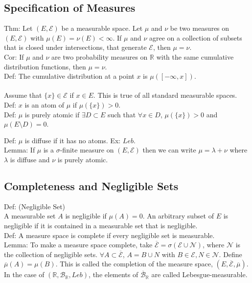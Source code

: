 \documentclass[english, 11pt]{article}
\begin{document}
\subsection{Specification of Measures}

Thm: Let $(E, \mathcal{E})$ be a measurable space. Let $\mu$ and $\nu$ be two measures on $(E, \mathcal{E})$ with $\mu(E) = \nu(E) < \infty$. If $\mu$ and $\nu$ agree on a collection of subsets that is closed under intersections, that generate $\mathcal{E}$, then $\mu = \nu$.\\

Cor: If $\mu$ and $\nu$ are two probability measures on $\mathbb{R}$ with the same cumulative distribution functions, then $\mu = \nu$.\\

Def: The cumulative distribution at a point $x$ is $\mu([-\infty, x])$.\\\\

Assume that $\{x\} \in \mathcal{E}$ if $x \in E$. This is true of all standard measurable spaces.\\

Def: $x$ is an atom of $\mu$ if $\mu(\{x\}) > 0$.\\

Def: $\mu$ is purely atomic if $\exists D \subset E$ such that $\forall x \in D$, $\mu(\{x\}) > 0$ and $\mu(E \setminus D) = 0$.

Def: $\mu$ is diffuse if it has no atoms. Ex: $Leb$.\\

Lemma: If $\mu$ is a $\sigma$-finite measure on $(E, \mathcal{E})$ then we can write $\mu = \lambda + \nu$ where $\lambda$ is diffuse and $\nu$ is purely atomic.\\

\subsection{Completeness and Negligible Sets}

Def: (Negligible Set)\\
A measurable set $A$ is negligible if $\mu(A) = 0$. An arbitrary subset of $E$ is negligible if it is contained in a measurable set that is negligible.\\

Def: A measure space is complete if every negligible set is measurable.\\

Lemma: To make a measure space complete, take $\overline{\mathcal{E}} = \sigma(\mathcal{E} \cup \mathcal{N})$, where $\mathcal{N}$ is the collection of negligible sets. $\forall A \subset \overline{\mathcal{E}}$, $A = B \cup N$ with $B \in \mathcal{E}, N \in \mathcal{N}$. Define $\overline{\mu}(A) = \mu(B)$. This is called the completion of the measure space, $(E, \overline{\mathcal{E}}, \overline{\mu})$. In the case of $(\mathbb{R}, \mathcal{B}_{\mathbb{R}}, Leb)$, the elements of $\overline{\mathcal{B}}_\mathbb{R}$ are called Lebesgue-measurable.\\
\end{document}
